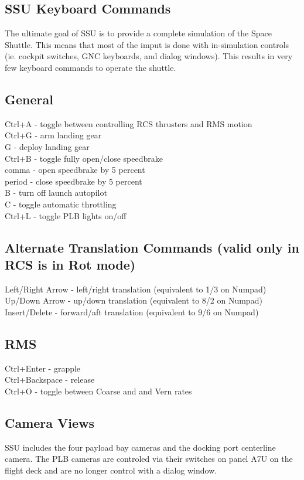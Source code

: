 \documentclass[13pt, letter,final]{article}
\begin{document}
\subsection*{\large SSU Keyboard Commands}
The ultimate goal of SSU is to provide a complete simulation of the Space Shuttle.  This means that most of the imput is done with in-simulation controls (ie. cockpit switches, GNC keyboards, and dialog windows). This results in very few keyboard commands to operate the shuttle.

\subsection*{General}
Ctrl+A - toggle between controlling RCS thrusters and RMS motion\\
Ctrl+G - arm landing gear\\
G - deploy landing gear\\
Ctrl+B - toggle fully open/close speedbrake\\
comma - open speedbrake by 5 percent\\
period - close speedbrake by 5 percent\\
B - turn off launch autopilot\\
C - toggle automatic throttling\\
Ctrl+L - toggle PLB lights on/off

\subsection*{Alternate Translation Commands (valid only in RCS is in Rot mode)}
Left/Right Arrow - left/right translation (equivalent to 1/3 on Numpad)\\
Up/Down Arrow - up/down translation (equivalent to 8/2 on Numpad)\\
Insert/Delete - forward/aft translation (equivalent to 9/6 on Numpad)\\

\subsection*{RMS}
Ctrl+Enter - grapple\\
Ctrl+Backspace - release\\
Ctrl+O - toggle between Coarse and and Vern rates\\
\newpage

\subsection*{\large Camera Views}
SSU includes the four payload bay cameras and the docking port centerline camera. The PLB cameras are controled via their switches on panel A7U on the flight deck and are no longer control with a dialog window.
\end{document}
